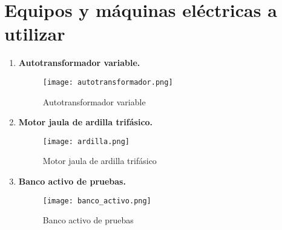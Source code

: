 \documentclass[a4paper,11pt]{article}
\begin{document}
\section{Equipos y máquinas eléctricas a utilizar}
\begin{enumerate}
    \item \textbf{Autotransformador variable.}
    \begin{figure}[H]
        \centering
        \texttt{[image: autotransformador.png]}
        \caption{Autotransformador variable}
    \end{figure}
    \item \textbf{Motor jaula de ardilla trifásico.}
    \begin{figure}[H]
        \centering
        \texttt{[image: ardilla.png]}
        \caption{Motor jaula de ardilla trifásico}
    \end{figure}
    \item \textbf{Banco activo de pruebas.}
    \begin{figure}[H]
        \centering
        \texttt{[image: banco\_activo.png]}
        \caption{Banco activo de pruebas}
    \end{figure}
\end{enumerate}
\end{document}
